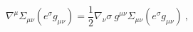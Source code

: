 \begin{equation}
\nabla^{\mu }\Sigma_{\mu \nu}(e^{\sigma}g_{\mu \nu})
=\frac{1}{2}\nabla_{\nu} \sigma ~g^{\mu\nu}
\Sigma_{\mu\nu}(e^{\sigma}g_{\mu \nu})~, \label{7a}\end{equation}

